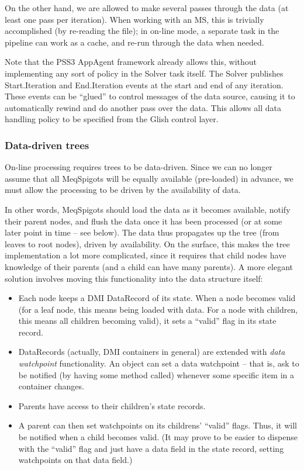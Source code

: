 \documentclass[12pt]{article}
\begin{document}
  On the other hand, we are allowed to make several passes through the data (at
  least one pass per iteration). When working with an MS, this is trivially
  accomplished (by re-reading the file); in on-line mode, a separate task in
  the pipeline can work as a cache, and re-run through the data when needed. 

  Note that the PSS3 AppAgent framework already allows this, without
  implementing any sort of policy in the Solver task itself. The Solver
  publishes Start.Iteration and End.Iteration events at the start and end of
  any iteration. These events can be ``glued'' to control messages of the data
  source, causing it to automatically rewind and do another pass over the data.
  This allows all data handling policy to be specified from the Glish control
  layer.

\subsubsection{Data-driven trees}

  On-line processing requires trees to be data-driven. Since we can no longer
  assume that all MeqSpigots will be equally available (pre-loaded) in advance,
  we must allow the processing to be driven by the availability of data.

  In other words, MeqSpigots should load the data as it becomes available,
  notify their parent nodes, and flush the data once it has been processed (or
  at some later point in time -- see below). The data thus propagates up the
  tree (from leaves to root nodes), driven by availability. On the surface,
  this makes the tree implementation a lot more complicated, since it requires
  that child nodes have knowledge of their parents (and a child can have many
  parents). A more elegant solution involves moving this functionality into the
  data structure itself:

  \begin{itemize}
  
  \item Each node keeps a DMI DataRecord of its state. When a node becomes
  valid (for a leaf node, this means being loaded with data. For a node with
  children, this means all children becoming valid), it sets a ``valid'' flag
  in its state record.

  \item DataRecords (actually, DMI containers in general) are extended with 
  {\em data watchpoint} functionality. An object can set a data watchpoint --
  that is, ask to be notified (by having some method called) whenever some
  specific item in a container changes.

  \item Parents have access to their children's state records.
  
  \item A parent can then set watchpoints on its childrens' ``valid'' flags. 
  Thus, it will be notified when a child becomes valid. (It may prove to be
  easier to dispense with the ``valid'' flag and just have a data field in the
  state record, setting watchpoints on that data field.)

  \end{itemize}
  
\end{document}
